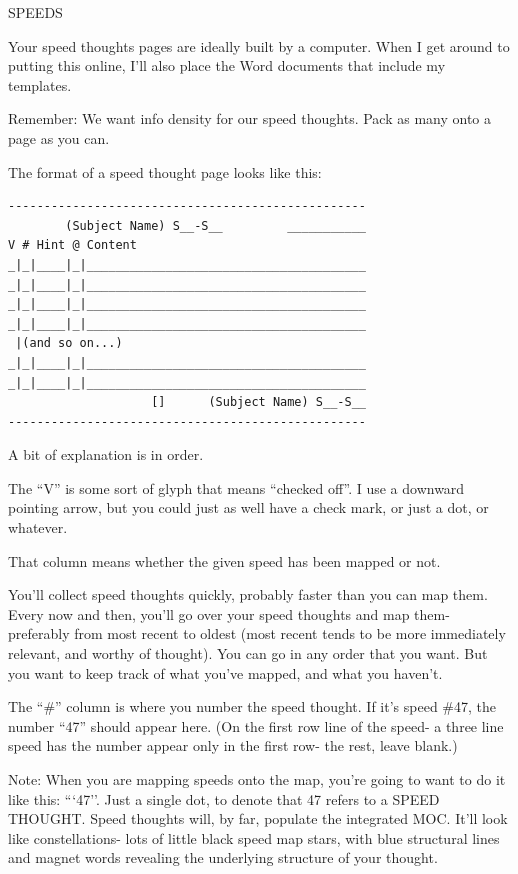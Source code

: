 \documentclass[oneside]{book}
\begin{document}
SPEEDS

Your speed thoughts pages are ideally built by a computer. When I get
around to putting this online, I'll also place the Word documents that
include my templates.

Remember: We want info density for our speed thoughts. Pack as many
onto a page as you can.

The format of a speed thought page looks like this:

\begin{verbatim}
--------------------------------------------------
        (Subject Name) S__-S__         ___________
V # Hint @ Content
_|_|____|_|_______________________________________
_|_|____|_|_______________________________________
_|_|____|_|_______________________________________
_|_|____|_|_______________________________________
 |(and so on...)
_|_|____|_|_______________________________________
_|_|____|_|_______________________________________
                    []      (Subject Name) S__-S__
--------------------------------------------------
\end{verbatim}

A bit of explanation is in order.

The ``V'' is some sort of glyph that means ``checked off''. I use a
downward pointing arrow, but you could just as well have a check mark,
or just a dot, or whatever.

That column means whether the given speed has been mapped or not.

You'll collect speed thoughts quickly, probably faster than you can
map them. Every now and then, you'll go over your speed thoughts and
map them- preferably from most recent to oldest (most recent tends to
be more immediately relevant, and worthy of thought). You can go in
any order that you want. But you want to keep track of what you've
mapped, and what you haven't.

The ``\#'' column is where you number the speed thought. If it's speed
\#47, the number ``47'' should appear here. (On the first row line of the
speed- a three line speed has the number appear only in the first row-
the rest, leave blank.)

Note: When you are mapping speeds onto the map, you're going to want
to do it like this:  ```47''. Just a single dot, to denote that 47
refers to a SPEED THOUGHT. Speed thoughts will, by far, populate the
integrated MOC. It'll look like constellations- lots of little black
speed map stars, with blue structural lines and magnet words revealing
the underlying structure of your thought.
\end{document}
